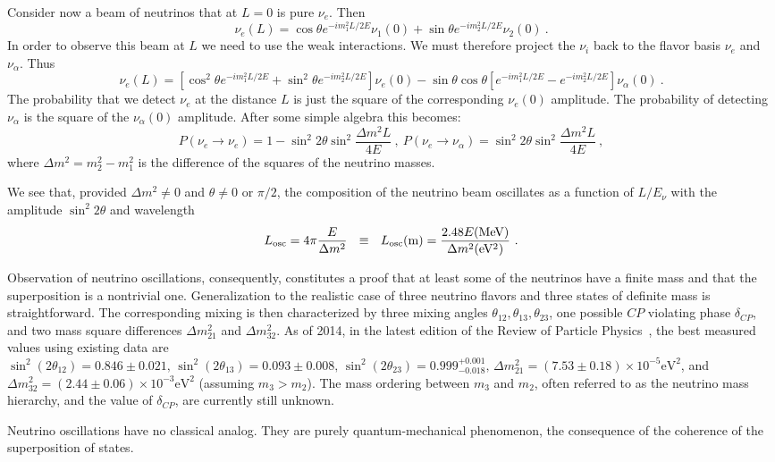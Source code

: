 \documentclass[aps,twocolumn,preprintnumbers,amsmath,superscriptaddress,amssymb,floats,nofootinbib]{revtex4-1}
\begin{document}
{{Consider now a beam of neutrinos that at $L=0$ is pure $\nu_e$. Then
\begin{equation}
\nu_e (L) = \cos \theta e^{-i m_1^2 L/2E} \nu_1(0) + \sin \theta e^{-i m_2^2 L/2E} \nu_2 (0) ~.
\end{equation}
In order to observe this beam at $L$ we need to use the weak interactions.  We must therefore project the $\nu_i$ back to the flavor basis $\nu_e$ and $\nu_{\alpha}$.
Thus
\begin{equation}
\nu_e (L) = [\cos^2 \theta e^{-i m_1^2 L/2E} + \sin^2 \theta e^{-i m_2^2 L/2E}] \nu_e(0) - 
\sin \theta \cos \theta [e^{-i m_1^2 L/2E} - e^{-i m_2^2 L/2E}] \nu_{\alpha}(0) ~.
\end{equation}
The probability that we detect $\nu_e$ at the distance $L$ is just the square of the corresponding $\nu_e(0)$ amplitude. The probability
of detecting $\nu_{\alpha}$ is the square of the $\nu_{\alpha}(0)$ amplitude. After some simple algebra this becomes:
\begin{equation}\label{eq:osci}
P(\nu_e \rightarrow \nu_e) = 1 - \sin^2 2 \theta \sin^2 \frac{\Delta m^2 L}{4 E} ~,~ P(\nu_e \rightarrow \nu_{\alpha}) =  \sin^2 2 \theta \sin^2 \frac{\Delta m^2 L}{4 E} ~,
\end{equation}
where $\Delta m^2 = m^2_2 - m^2_1$ is the difference of the squares of the neutrino masses. 

We see that, provided $\Delta m^2 \ne 0$ and $\theta \ne 0$ or $\pi/2$, the composition of the neutrino beam oscillates as a function of $L/E_{\nu}$ 
with the amplitude $\sin^2 2 \theta$ and wavelength
\begin{equation}
L_{\textrm{osc}} = 4 \pi \frac{E}{\Delta m^2} ~~\equiv ~~ L_{\textrm{osc}} ({\rm m}) = \frac{2.48 E {\rm (MeV)}}{ \Delta m^2 {\rm (eV^2)}} ~. 
\end{equation}

Observation of neutrino oscillations, consequently, constitutes a proof that at least some of the neutrinos have a finite mass and that the superposition is
a nontrivial one. Generalization to the realistic case of three neutrino flavors and three
states of definite mass is straightforward. The corresponding mixing is then characterized by three mixing angles $\theta_{12}, \theta_{13}, \theta_{23}$,
 one possible $CP$ violating phase $\delta_{CP}$,
and two mass square differences $\Delta m^2_{21}$ and $\Delta m^2_{32}$.
As of 2014, in the latest edition of the Review of Particle Physics~\cite{PDG14}, the best measured values using existing data are $\sin^2(2\theta_{12}) = 0.846 \pm 0.021, \, \sin^2(2\theta_{13}) = 0.093 \pm 0.008, \, \sin^2(2\theta_{23}) = 0.999^{+0.001}_{-0.018}, \, \Delta m^2_{21} = (7.53 \pm 0.18) \times 10^{-5} \textrm{eV}^2$, and $\Delta m^2_{32} = (2.44\pm 0.06) \times 10^{-3} \textrm{eV}^2$ (assuming $m_3 > m_2$). The mass ordering between $m_3$ and $m_2$, often referred to as the neutrino mass hierarchy, and the value of $\delta_{CP}$, are currently still unknown.

Neutrino oscillations have no classical analog. They are purely quantum-mechanical phenomenon, the consequence of the coherence of the
superposition of states.

   }%
}
\end{document}
